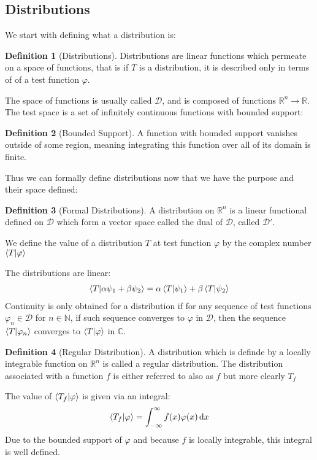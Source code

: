 \documentclass[12pt]{article}
\theoremstyle{plain}
\theoremstyle{definition}
\newtheorem{definition}{Definition}[section]
\newcommand{\vphi}{\varphi}
\begin{document}
\subsection{Distributions}
We start with defining what a distribution is:
\begin{definition}[Distributions]
  Distributions are linear functions which permeate on a space of functions, that is if $T$ is a distribution, it is described only in terms of of a test function $\vphi$.
\end{definition}
The space of functions is usually called $\mathcal{D}$, and is composed of functions $\mathbb{R}^n\to\mathbb{R}$. The test space is a set of infinitely continuous functions with bounded support:
\begin{definition}[Bounded Support]
  A function with bounded support vanishes outside of some region, meaning integrating this function over all of its domain is finite.
\end{definition}
Thus we can formally define distributions now that we have the purpose and their space defined:
\begin{definition}[Formal Distributions]
  A distribution on $\mathbb{R}^n$ is a linear functional defined on $\mathcal{D}$ which form a vector space called the dual of $\mathcal{D}$, called $\mathcal{D}'$.

  We define the value of a distribution $T$ at test function $\vphi$ by the complex number $\ip{T}{\vphi}$
\end{definition}
The distributions are linear:
\begin{align*}
  \ip{T}{\alpha\psi_1+\beta\psi_2}=\alpha\ip{T}{\psi_1}+\beta\ip{T}{\psi_2}
\end{align*}
Continuity is only obtained for a distribution if for any sequence of test functions $\vphi_n\in\mathcal{D}$ for $n\in\mathbb{N}$, if such sequence converges to $\vphi$ in $\mathcal{D}$, then the sequence $\ip{T}{\vphi_n}$ converges to $\ip{T}{\vphi}$ in $\mathbb{C}$.

\begin{definition}[Regular Distribution]
  A distribution which is definde by a locally integrable function on $\mathbb{R}^n$ is called a regular distribution. The distribution associated with a function $f$ is either referred to also as $f$ but more clearly $T_f$
\end{definition}
The value of $\ip{T_f}{\vphi}$ is given via an integral:
\begin{align*}
  \ip{T_f}{\vphi}=\int_{-\infty}^\infty f(x)\vphi(x)\dd{x}
\end{align*}
Due to the bounded support of $\vphi$ and because $f$ is locally integrable, this integral is well defined.
\end{document}
